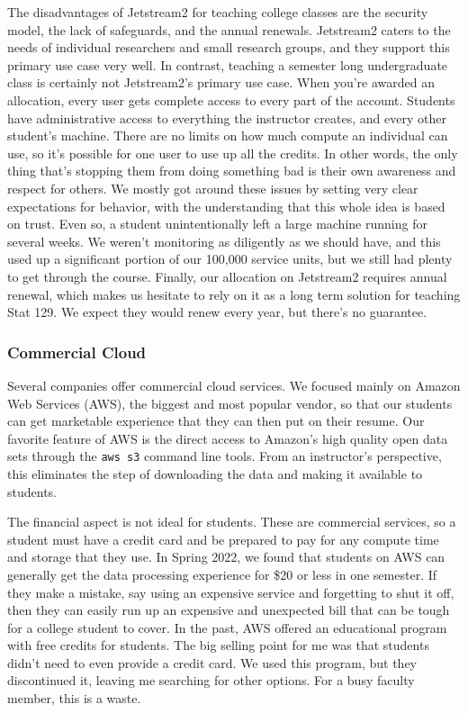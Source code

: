 \documentclass[12pt]{article}
\begin{document}
The disadvantages of Jetstream2 for teaching college classes are the security model, the lack of safeguards, and the annual renewals.
Jetstream2 caters to the needs of individual researchers and small research groups, and they support this primary use case very well.
In contrast, teaching a semester long undergraduate class is certainly not Jetstream2's primary use case.
When you're awarded an allocation, every user gets complete access to every part of the account.
Students have administrative access to everything the instructor creates, and every other student's machine.
There are no limits on how much compute an individual can use, so it's possible for one user to use up all the credits.
In other words, the only thing that's stopping them from doing something bad is their own awareness and respect for others.
We mostly got around these issues by setting very clear expectations for behavior, with the understanding that this whole idea is based on trust.
Even so, a student unintentionally left a large machine running for several weeks.
We weren't monitoring as diligently as we should have, and this used up a significant portion of our 100,000 service units, but we still had plenty to get through the course.
Finally, our allocation on Jetstream2 requires annual renewal, which makes us hesitate to rely on it as a long term solution for teaching Stat 129.
We expect they would renew every year, but there's no guarantee.


\subsubsection{Commercial Cloud}

Several companies offer commercial cloud services.
We focused mainly on Amazon Web Services (AWS), the biggest and most popular vendor, so that our students can get marketable experience that they can then put on their resume.
Our favorite feature of AWS is the direct access to Amazon's high quality open data sets through the \texttt{aws s3} command line tools.
From an instructor's perspective, this eliminates the step of downloading the data and making it available to students.

The financial aspect is not ideal for students.
These are commercial services, so a student must have a credit card and be prepared to pay for any compute time and storage that they use.
In Spring 2022, we found that students on AWS can generally get the data processing experience for \$20 or less in one semester.
If they make a mistake, say using an expensive service and forgetting to shut it off, then they can easily run up an expensive and unexpected bill that can be tough for a college student to cover.
In the past, AWS offered an educational program with free credits for students.
The big selling point for me was that students didn't need to even provide a credit card.
We used this program, but they discontinued it, leaving me searching for other options.
For a busy faculty member, this is a waste.
\end{document}
